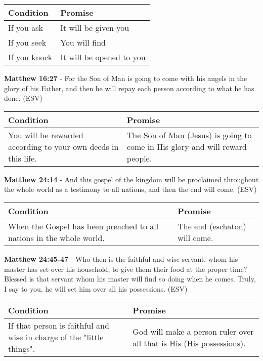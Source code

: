 \documentclass[11pt]{article}
\begin{document}
\begin{center}
\begin{tabular}{ll}
Condition & Promise\\[0pt]
\hline
If you ask & It will be given you\\[0pt]
If you seek & You will find\\[0pt]
If you knock & It will be opened to you\\[0pt]
\end{tabular}
\end{center}

\textbf{Matthew 16:27} -  For the Son of Man is going to come with his angels in the glory of his Father, and then he will repay each person according to what he has done.  (ESV)

\begin{center}
\begin{tabular}{ll}
Condition & Promise\\[0pt]
\hline
You will be rewarded according to your own deeds in this life. & The Son of Man (Jesus) is going to come in His glory and will reward people.\\[0pt]
\end{tabular}
\end{center}

\textbf{Matthew 24:14} -  And this gospel of the kingdom will be proclaimed throughout the whole world as a testimony to all nations, and then the end will come.  (ESV)

\begin{center}
\begin{tabular}{ll}
Condition & Promise\\[0pt]
\hline
When the Gospel has been preached to all nations in the whole world. & The end (eschaton) will come.\\[0pt]
\end{tabular}
\end{center}

\textbf{Matthew 24:45-47} -  Who then is the faithful and wise servant, whom his master has set over his household, to give them their food at the proper time?  Blessed is that servant whom his master will find so doing when he comes.  Truly, I say to you, he will set him over all his possessions.  (ESV)

\begin{center}
\begin{tabular}{ll}
Condition & Promise\\[0pt]
\hline
If that person is faithful and wise in charge of the "little things". & God will make a person ruler over all that is His (His possessions).\\[0pt]
\end{tabular}
\end{center}
\end{document}
